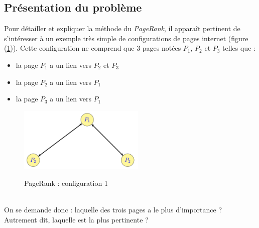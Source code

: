 \documentclass[a4paper,10pt]{report}
\begin{document}
\subsection{Présentation du problème}
Pour détailler et expliquer la méthode du \textit{PageRank}, il apparaît pertinent de s'intéresser à un exemple très simple de configurations de pages internet (figure (\ref{config1})). Cette configuration ne comprend que 3 pages notées $P_1$, $P_2$ et $P_3$ telles que :\\
\begin{minipage}[c]{.40\linewidth}
\begin{itemize}
\item la page $P_1$ a un lien vers $P_2$ et $P_3$
\item la page $P_2$ a un lien vers $P_1$
\item la page $P_3$ a un lien vers $P_1$
\end{itemize}
\end{minipage} \hfill
\begin{minipage}[c]{.58\linewidth}
\begin{figure}[H]
\centering
\caption{PageRank : configuration 1}
\includegraphics[width=6cm]{config1.png}
\label{config1}
\end{figure}
\end{minipage}\\

On se demande donc : laquelle des trois pages a le plus d'importance ? Autrement dit, laquelle est la plus pertinente ?\\ \\
\end{document}
